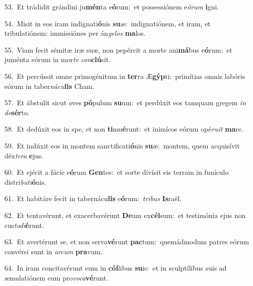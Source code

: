 {\numbfont\textcolor{\numbcolor}{53.}}~Et trádidit grándini ju\-\textbf{mén}\-ta e\-\textbf{ó}\-rum:~\star et possessiónem e\-\textit{ó}\-\textit{rum} \textbf{i}\-gni.\par
{\numbfont\textcolor{\numbcolor}{54.}}~Misit in eos iram indignati\-\textbf{ó}\-nis \textbf{su}\-æ:~\star indignatiónem, et iram, et tribulatiónem: immissiónes per án\-\textit{ge}\-\textit{los} \textbf{ma}\-los.\par
{\numbfont\textcolor{\numbcolor}{55.}}~Viam fecit sémitæ iræ suæ, non pepércit a morte ani\-\textbf{má}\-bus e\-\textbf{ó}\-rum:~\star et juménta eórum in mor\textit{te} \textit{con}\-\textbf{clú}sit.\par
{\numbfont\textcolor{\numbcolor}{56.}}~Et percússit omne primogénitum in \textbf{ter}\-ra Æ\-\textbf{gýp}\-ti:~\star primítias omnis labóris eórum in taber\-\textit{ná}\-\textit{cu}\textbf{lis} Cham.\par
{\numbfont\textcolor{\numbcolor}{57.}}~Et ábstulit sicut oves \textbf{pó}\-pulum \textbf{su}\-um:~\star et perdúxit eos tamquam gregem \textit{in} \textit{de}\-\textbf{sér}to.\par
{\numbfont\textcolor{\numbcolor}{58.}}~Et dedúxit eos in spe, et non \textbf{ti}\-mu\-\textbf{é}\-runt:~\star et inimícos eórum opé\-\textit{ru}\-\textit{it} \textbf{ma}\-re.\par
{\numbfont\textcolor{\numbcolor}{59.}}~Et indúxit eos in montem sanctificati\-\textbf{ó}\-nis \textbf{su}\-æ:~\star montem, quem acquisívit déx\-\textit{te}\-\textit{ra} \textbf{e}\-jus.\par
{\numbfont\textcolor{\numbcolor}{60.}}~Et ejécit a fácie e\-\textbf{ó}\-rum \textbf{Gen}\-tes:~\star et sorte divísit eis terram in funículo distri\-\textit{bu}\-\textit{ti}\textbf{ó}nis.\par
{\numbfont\textcolor{\numbcolor}{61.}}~Et habitáre fecit in tabernácu\textbf{lis} e\-\textbf{ó}\-rum:~\star \textit{tri}\-\textit{bus} \textbf{Is}\-raël.\par
{\numbfont\textcolor{\numbcolor}{62.}}~Et tentavérunt, et exacerbavérunt \textbf{De}\-um ex\-\textbf{cél}\-sum:~\star et testimónia ejus non cus\-\textit{to}\-\textit{di}\textbf{é}runt.\par
{\numbfont\textcolor{\numbcolor}{63.}}~Et avertérunt se, et non serva\-\textbf{vé}\-runt \textbf{pac}\-tum:~\star quemádmodum patres eórum convérsi sunt in \textit{ar}\-\textit{cum} \textbf{pra}\-vum.\par
{\numbfont\textcolor{\numbcolor}{64.}}~In iram concitavérunt eum in \textbf{cól}\-libus \textbf{su}\-is:~\star et in sculptílibus suis ad æmulatiónem eum pro\-\textit{vo}\-\textit{ca}\textbf{vé}runt.\par
